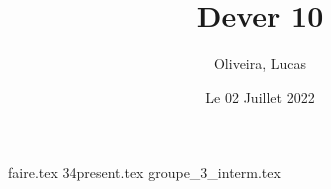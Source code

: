 \documentclass{article}
\title{Dever 10}
\author{Oliveira, Lucas}
\date{Le 02 Juillet 2022}
\begin{document}
    \maketitle
    \tableofcontents

    \newpage
    {faire.tex}
    {34present.tex}
    {groupe_3_interm.tex}
\end{document}
